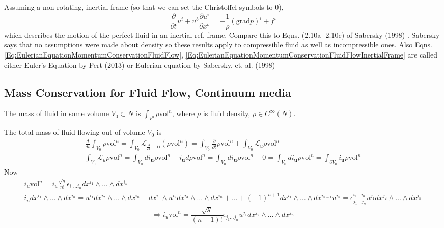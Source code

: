 \documentclass[10pt]{amsart}
\begin{document}
\begin{multicols*}{2}
Assuming a non-rotating, inertial frame (so that we can set the Christoffel symbols to 0),
\begin{equation}\label{Eq:EulerianEquationMomentumConservationFluidFlowInertialFrame}
\frac{\partial}{\partial t} u^i + u^b \frac{\partial u^i}{\partial x^b} = - \frac{1}{\rho}(\text{grad}p)^i + f^i
\end{equation}
which describes the motion of the perfect fluid in an inertial ref. frame. Compare this to Eqns. (2.10a- 2.10c) of Sabersky (1998) \cite{SAHG1998}. Sabersky says that no assumptions were made about density so these results apply to compressible fluid as well as incompressible ones. Also Eqns. \ref{Eq:EulerianEquationMomentumConservationFluidFlow}, \ref{Eq:EulerianEquationMomentumConservationFluidFlowInertialFrame} are called either Euler's Equation by Pert (2013) \cite{Pert2013} or Eulerian equation by Sabersky, et. al. (1998) \cite{SAHG1998}



\subsection{Mass Conservation for Fluid Flow, Continuum media}

The mass of fluid in some volume $V_0 \subset N$ is $\int_{V^0} \rho \text{vol}^n$, where $\rho$ is fluid density, $\rho \in C^{\infty}(N)$.  

The total mass of fluid flowing out of volume $V_0$ is 
\[
\begin{gathered}
\frac{d}{dt} \int_{V_0} \rho \text{vol}^n = \int_{V_0} \mathcal{L}_{\frac{\partial}{\partial t} + \textbf{u}} (\rho \text{vol}^n) = \int_{V_0} \frac{ \partial }{\partial t} \rho \text{vol}^n + \int_{V_0} \mathcal{L}_u \rho \text{vol}^n   \\
\int_{V_0} \mathcal{L}_u \rho \text{vol}^n = \int_{V_0} di_{\mathbf{u}} \rho \text{vol}^n  + i_{\mathbf{u}} d\rho \text{vol}^n = \int_{V_0} di_{\mathbf{u}} \rho \text{vol}^n + 0 = \int_{V_0} di_{\mathbf{u}} \rho \text{vol}^n = \int_{\partial V_0} i_{\mathbf{u}} \rho \text{vol}^n
\end{gathered}
\]  
Now
\[
\begin{gathered}
i_u \text{vol}^n = i_u\frac{\sqrt{g}}{n!} \epsilon_{i_1 \dots i_n} dx^{i_1} \wedge \dots \wedge dx^{i_n} \\ 
i_u dx^{i_1} \wedge \dots \wedge dx^{i_n} = u^{i_1} dx^{i_2} \wedge \dots \wedge dx^{i_n} - dx^{i_1} \wedge u^{i_2} dx^{i_3} \wedge \dots \wedge dx^{i_n} +  \dots + (-1)^{n+1} dx^{i_1} \wedge \dots \wedge dx^{i_{n-1}} u^{i_n} = \epsilon^{i_1 \dots i_n}_{j_1 \dots j_n } u^{j_1 } dx^{j_2} \wedge \dots \wedge dx^{j_n}  
\end{gathered} 
\]
\begin{equation}\label{Eq:TimeIndependentMassVolumeTerm}
\Longrightarrow i_u\text{vol}^n = \frac{ \sqrt{g}}{ (n-1)!} \epsilon_{j_1 \dots j_n} u^{j_1} dx^{j_2} \wedge \dots \wedge dx^{j_n}
\end{equation}


\end{multicols*}
\end{document}
